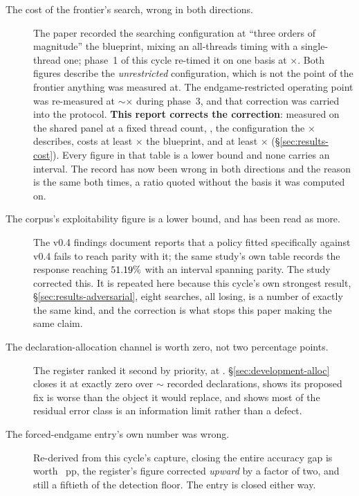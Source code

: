\begin{description}

\item[The cost of the frontier's search, wrong in both directions.] The \vsix{} paper recorded the
  searching configuration at ``three orders of magnitude'' the blueprint, mixing an all-threads
  timing with a single-thread one; phase~1 of this cycle re-timed it on one basis at
  \vsevenPhaseOneCost$\times$. Both figures describe the
  \emph{unrestricted} configuration, which is not the point of the frontier anything was measured at.
  The endgame-restricted operating point was re-measured at $\sim$\vsevenCostRecorded$\times$ during
  phase~3, and that correction was carried into the protocol. \textbf{This report corrects the correction}: measured on the shared panel at a fixed thread count,
  \fcheap{}, the configuration the \vsevenCostRecorded$\times$ describes, costs at least
  \vsevenCostFcheapTight$\times$ the blueprint, and \sestina{} at least
  \vsevenCostFrozenTight$\times$ (\S\ref{sec:results-cost}). Every figure in that table is a lower
  bound and none carries an interval. The record has now been wrong in both directions and the reason is the
  same both times, a ratio quoted without the basis it was computed on.

\item[The corpus's exploitability figure is a lower bound, and has been read as more.] The v0.4 findings document reports that a policy fitted
  specifically against v0.4 fails to reach parity with it; the same study's own table records the
  response reaching $51.19\%$ with an interval spanning parity. The \vsix{} study corrected this. It is
  repeated here because this cycle's own strongest result, \S\ref{sec:results-adversarial}, eight searches, all
  losing, is a number of exactly the same kind, and the correction is what stops this paper making
  the same claim.

\item[The declaration-allocation channel is worth zero, not two percentage points.] The
  register ranked it second by priority, at \vsevenLonePriority{}. \S\ref{sec:development-alloc} closes it
  at exactly zero over $\sim$\vsevenLoneDecls{} recorded declarations, shows its proposed fix is worse
  than the object it would replace, and shows most of the residual error class is an information limit
  rather than a defect.

\item[The forced-endgame entry's own number was wrong.]
  Re-derived from this cycle's capture, closing the entire accuracy gap is worth
  \vsevenLthirteenClose{}~pp, the register's figure corrected \emph{upward} by a factor
  of two, and still a fiftieth of the detection floor. The entry is closed either way.


\end{description}

